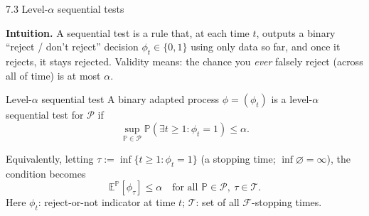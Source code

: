 \documentclass[aspectratio=169,10pt]{beamer}
\begin{document}
\begin{frame}{7.3 Level-$\alpha$ sequential tests}

\textbf{Intuition.} A sequential test is a rule that, at each time $t$, outputs a binary ``reject / don't reject''
decision $\phi_t \in \{0,1\}$ using only data so far, and once it rejects, it stays rejected. Validity means: the
chance you \emph{ever} falsely reject (across all of time) is at most $\alpha$.

\begin{block}{Level-$\alpha$ sequential test}
A binary adapted process $\phi = (\phi_t)$ is a level-$\alpha$ sequential test for $\mathcal P$ if
\begin{equation}
\sup_{\mathbb{P}\in\mathcal P} \mathbb{P}(\exists t \ge 1 : \phi_t = 1) \le \alpha.
\tag{7.1}
\end{equation}
\end{block}

Equivalently, letting $\tau := \inf\{t\ge 1 : \phi_t = 1\}$ (a stopping time; $\inf \varnothing = \infty$), the
condition becomes
\begin{equation}
\mathbb{E}^{\mathbb{P}}[\phi_\tau] \le \alpha \quad \text{for all } \mathbb{P}\in\mathcal P,\ \tau\in\mathcal T.
\tag{7.2}
\end{equation}
Here $\phi_t$: reject-or-not indicator at time $t$; $\mathcal T$: set of all $\mathcal F$-stopping times.

\end{frame}
\end{document}
